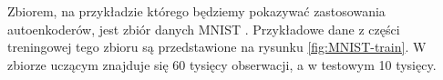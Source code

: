 \documentclass[12pt]{mwbk}
\theoremstyle{plain}
\theoremstyle{definition}
\theoremstyle{remark}
\newcommand\zrodlo[1]{\par\vspace{-3mm}{\small\textit{Źródło: }#1 }}
\begin{document}













Zbiorem, na przykładzie którego będziemy pokazywać zastosowania autoenkoderów, jest zbiór danych MNIST \cite{mnist}. Przykładowe dane z części treningowej tego zbioru są przedstawione na rysunku \ref{fig:MNIST-train}. W zbiorze uczącym znajduje się 60 tysięcy obserwacji, a w testowym 10 tysięcy.
\end{document}
